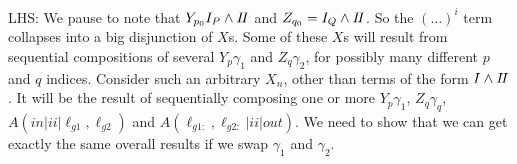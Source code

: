 LHS:
We pause to note that $Y_{p_0} I_P \land I\!I$
and $Z_{q_0} = I_Q \land I\!I$.
So the $(\dots)^i$ term collapses into a big disjunction
of $X$s.
Some of these $X$s will result from sequential compositions
of several $Y_p\gamma_1$ and $Z_q\gamma_2$, for possibly
many different $p$ and $q$ indices.
Consider such an arbitrary $X_n$, other than terms of the form $I\land I\!I$.
It will be the result of sequentially composing one or more $Y_p\gamma_1$,
$Z_q\gamma_q$, $A(in|ii|\ell_{g1},\ell_{g2})$ and $A(\ell_{g1:},\ell_{g2:}|ii|out)$.
We need to show that we can get exactly the same overall results
if we swap $\gamma_1$ and $\gamma_2$.

